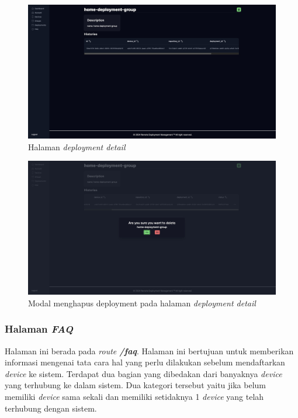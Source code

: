 \begin{figure}[h]
  \centering
  \includegraphics[width=1\textwidth]{resources/chapter-4/dashboard/deployment-detail-page.jpg}
  \caption{Halaman \textit{deployment detail}}
  \label{fig:halaman-deployment-detail}
\end{figure}

\begin{figure}[h]
  \centering
  \includegraphics[width=1\textwidth]{resources/chapter-4/dashboard/deployment-detail-delete.jpg}
  \caption{Modal menghapus deployment pada halaman \textit{deployment detail}}
  \label{fig:halaman-deployment-detail-delete}
\end{figure}

\pagebreak

\subsubsection{Halaman \textit{FAQ}}
Halaman ini berada pada \textit{route \textbf{/faq}}. Halaman ini bertujuan untuk memberikan informasi mengenai tata cara hal yang perlu dilakukan sebelum mendaftarkan \textit{device} ke sistem. Terdapat dua bagian yang dibedakan dari banyaknya \textit{device} yang terhubung ke dalam sistem. Dua kategori tersebut yaitu jika belum memiliki \textit{device} sama sekali dan memiliki setidaknya 1 \textit{device} yang telah terhubung dengan sistem.
